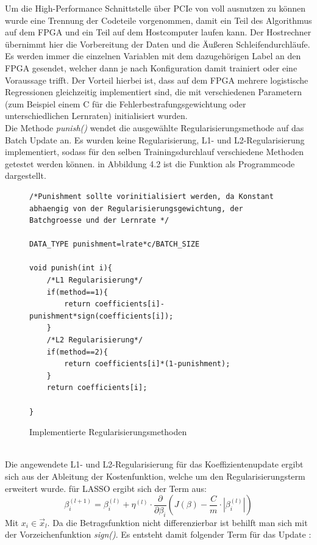 Um die High-Performance Schnittstelle über PCIe von \cite{DILL} voll ausnutzen zu können wurde eine Trennung der Codeteile vorgenommen, damit ein Teil des Algorithmus auf dem FPGA und ein Teil auf dem Hostcomputer laufen kann. Der Hostrechner übernimmt hier die Vorbereitung der Daten und die Äußeren Schleifendurchläufe. Es werden immer die einzelnen Variablen mit dem dazugehörigen Label an den FPGA gesendet, welcher dann je nach Konfiguration damit trainiert oder eine Voraussage trifft. Der Vorteil hierbei ist, dass auf dem FPGA mehrere logistische Regressionen gleichzeitig implementiert sind, die mit verschiedenen Parametern (zum Beispiel einem C für die Fehlerbestrafungsgewichtung oder unterschiedlichen Lernraten) initialisiert wurden.\\
Die Methode \textit{punish()} wendet die ausgewählte Regularisierungsmethode auf das Batch Update an. Es wurden keine Regularisierung, L1- und L2-Regularisierung implementiert, sodass für den selben Trainingsdurchlauf verschiedene Methoden getestet werden können. in Abbildung 4.2 ist die Funktion als Programmcode dargestellt.\\
\begin{figure}[ht]
\centering
\begin{lstlisting}
/*Punishment sollte vorinitialisiert werden, da Konstant abhaengig von der Regularisierungsgewichtung, der Batchgroesse und der Lernrate */

DATA_TYPE punishment=lrate*c/BATCH_SIZE

void punish(int i){
	/*L1 Regularisierung*/
	if(method==1){
		return coefficients[i]-punishment*sign(coefficients[i]);
	}
	/*L2 Regularisierung*/
	if(method==2){
		return coefficients[i]*(1-punishment);
	}
	return coefficients[i];
	    
}
\end{lstlisting}
\caption{Implementierte Regularisierungsmethoden}
\end{figure}\\
Die angewendete L1- und L2-Regularisierung für das Koeffizientenupdate ergibt sich aus der Ableitung der Kostenfunktion, welche um den Regularisierungsterm erweitert wurde.
für LASSO ergibt sich der Term aus:
\begin{displaymath}
\beta_i^{(l+1)}=\beta_i^{(l)}+\eta^{(l)} \cdot \dfrac{\partial}{\partial \beta_i} \left( J(\beta)-\frac{C}{m} \cdot | \beta_i^{(l)} |\right)
\end{displaymath}
Mit $x_i \in \vec x_l$. Da die Betragsfunktion nicht differenzierbar ist behilft man sich mit der Vorzeichenfunktion \textit{sign()}. Es entsteht damit folgender Term für das Update \cite{L1C}:
